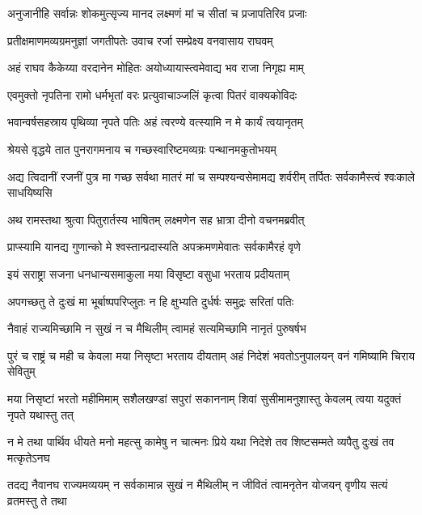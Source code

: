 \twolineshloka
{अनुजानीहि सर्वान्नः शोकमुत्सृज्य मानद}
{लक्ष्मणं मां च सीतां च प्रजापतिरिव प्रजाः} %

\twolineshloka
{प्रतीक्षमाणमव्यग्रमनुज्ञां जगतीपतेः}
{उवाच रर्जा सम्प्रेक्ष्य वनवासाय राघवम्} %

\twolineshloka
{अहं राघव कैकेय्या वरदानेन मोहितः}
{अयोध्यायास्त्वमेवाद्य भव राजा निगृह्य माम्} %

\twolineshloka
{एवमुक्तो नृपतिना रामो धर्मभृतां वरः}
{प्रत्युवाचाञ्जलिं कृत्वा पितरं वाक्यकोविदः} %

\twolineshloka
{भवान्वर्षसहस्राय पृथिव्या नृपते पतिः}
{अहं त्वरण्ये वत्स्यामि न मे कार्यं त्वयानृतम्} %

\twolineshloka
{श्रेयसे वृद्धये तात पुनरागमनाय च}
{गच्छस्वारिष्टमव्यग्रः पन्थानमकुतोभयम्} %

\threelineshloka
{अद्य त्विदानीं रजनीं पुत्र मा गच्छ सर्वथा}
{मातरं मां च सम्पश्यन्वसेमामद्य शर्वरीम्}
{तर्पितः सर्वकामैस्त्वं श्वःकाले साधयिष्यसि} %

\twolineshloka
{अथ रामस्तथा श्रुत्वा पितुरार्तस्य भाषितम्}
{लक्ष्मणेन सह भ्रात्रा दीनो वचनमब्रवीत्} %

\twolineshloka
{प्राप्स्यामि यानद्य गुणान्को मे श्वस्तान्प्रदास्यति}
{अपक्रमणमेवातः सर्वकामैरहं वृणे} %

\twolineshloka
{इयं सराष्ट्रा सजना धनधान्यसमाकुला}
{मया विसृष्टा वसुधा भरताय प्रदीयताम्} %

\twolineshloka
{अपगच्छतु ते दुःखं मा भूर्बाष्पपरिप्लुतः}
{न हि क्षुभ्यति दुर्धर्षः समुद्रः सरितां पतिः} %

\twolineshloka
{नैवाहं राज्यमिच्छामि न सुखं न च मैथिलीम्}
{त्वामहं सत्यमिच्छामि नानृतं पुरुषर्षभ} %

\fourlineindentedshloka
{पुरं च राष्ट्रं च मही च केवला}
{मया निसृष्टा भरताय दीयताम्}
{अहं निदेशं भवतोऽनुपालयन्}
{वनं गमिष्यामि चिराय सेवितुम्} %

\fourlineindentedshloka
{मया निसृष्टां भरतो महीमिमाम्}
{सशैलखण्डां सपुरां सकाननाम्}
{शिवां सुसीमामनुशास्तु केवलम्}
{त्वया यदुक्तं नृपते यथास्तु तत्} %

\fourlineindentedshloka
{न मे तथा पार्थिव धीयते मनो}
{महत्सु कामेषु न चात्मनः प्रिये}
{यथा निदेशे तव शिष्टसम्मते}
{व्यपैतु दुःखं तव मत्कृतेऽनघ} %

\fourlineindentedshloka
{तदद्य नैवानघ राज्यमव्ययम्}
{न सर्वकामान्न सुखं न मैथिलीम्}
{न जीवितं त्वामनृतेन योजयन्}
{वृणीय सत्यं व्रतमस्तु ते तथा} %

